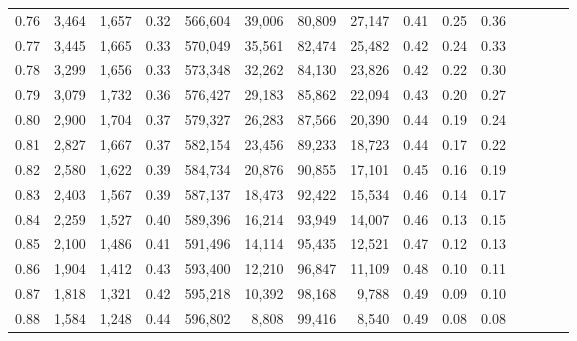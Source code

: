 \begin{tabular}{rrrcrrrrrrrrrrr}
0.76 &   3,464 &  1,657 &                                       0.32 &  566,604 &   39,006 &   80,809 &   27,147 &  0.41 &  0.25 &                         0.36 \\
0.77 &   3,445 &  1,665 &                                       0.33 &  570,049 &   35,561 &   82,474 &   25,482 &  0.42 &  0.24 &                         0.33 \\
0.78 &   3,299 &  1,656 &                                       0.33 &  573,348 &   32,262 &   84,130 &   23,826 &  0.42 &  0.22 &                         0.30 \\
0.79 &   3,079 &  1,732 &                                       0.36 &  576,427 &   29,183 &   85,862 &   22,094 &  0.43 &  0.20 &                         0.27 \\
0.80 &   2,900 &  1,704 &                                       0.37 &  579,327 &   26,283 &   87,566 &   20,390 &  0.44 &  0.19 &                         0.24 \\
0.81 &   2,827 &  1,667 &                                       0.37 &  582,154 &   23,456 &   89,233 &   18,723 &  0.44 &  0.17 &                         0.22 \\
0.82 &   2,580 &  1,622 &                                       0.39 &  584,734 &   20,876 &   90,855 &   17,101 &  0.45 &  0.16 &                         0.19 \\
0.83 &   2,403 &  1,567 &                                       0.39 &  587,137 &   18,473 &   92,422 &   15,534 &  0.46 &  0.14 &                         0.17 \\
0.84 &   2,259 &  1,527 &                                       0.40 &  589,396 &   16,214 &   93,949 &   14,007 &  0.46 &  0.13 &                         0.15 \\
0.85 &   2,100 &  1,486 &                                       0.41 &  591,496 &   14,114 &   95,435 &   12,521 &  0.47 &  0.12 &                         0.13 \\
0.86 &   1,904 &  1,412 &                                       0.43 &  593,400 &   12,210 &   96,847 &   11,109 &  0.48 &  0.10 &                         0.11 \\
0.87 &   1,818 &  1,321 &                                       0.42 &  595,218 &   10,392 &   98,168 &    9,788 &  0.49 &  0.09 &                         0.10 \\
0.88 &   1,584 &  1,248 &                                       0.44 &  596,802 &    8,808 &   99,416 &    8,540 &  0.49 &  0.08 &                         0.08 \\

\end{tabular}

